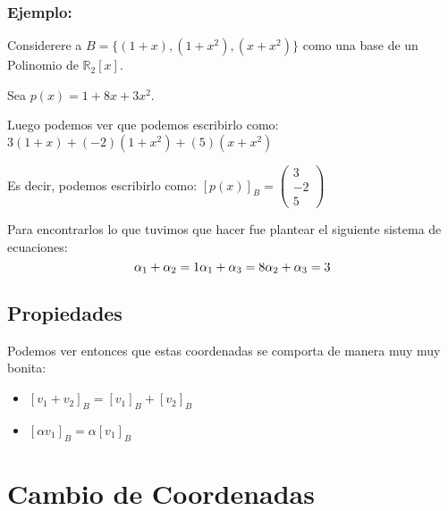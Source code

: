 \documentclass[12pt]{report}							    %
\begin{document}
        \clearpage

        \subsubsection{Ejemplo:}
        Considerere a $B = \{ (1+x), (1+x^2) , (x + x^2) \}$ como una base de un Polinomio de $\mathbb{R}_2[x]$.

        Sea $p(x) = 1+8x+3x^2$.

        Luego podemos ver que podemos escribirlo como:
        $3(1+x) + (-2)(1+x^2) + (5)(x+x^2)$

        Es decir, podemos escribirlo como:
        $[p(x)]_B =  \begin{pmatrix} 3\\-2\\5\end{pmatrix}$
         

        Para encontrarlos lo que tuvimos que hacer fue plantear el siguiente sistema de ecuaciones:
        \begin{equation*}
            \alpha_1 + \alpha_2 = 1  \\
            \alpha_1 + \alpha_3 = 8  \\
            \alpha_2 + \alpha_3 = 3  \\
        \end{equation*}


        \subsection{Propiedades}
        Podemos ver entonces que estas coordenadas se comporta de manera muy muy bonita:

        \begin{itemize}
            \item $[v_1 + v_2]_B = [v_1]_B + [v_2]_B$
            \item $[\alpha v_1]_B = \alpha [v_1]_B$
        \end{itemize}



    \clearpage
    \section{Cambio de Coordenadas}
\end{document}
